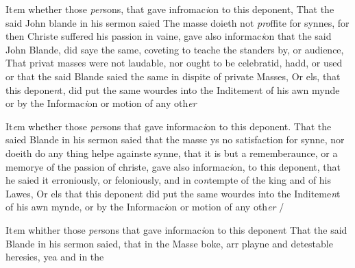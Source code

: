 \documentclass[12pt, a4paper]{book}
\begin{document}
 



				\marginpar[\vspace{0.5cm}{\textcolor{Gray}{2.}}]{}
			
	
		\ifthenelse{\isodd{\thepage}}
		{\reversemarginpar}
		{\normalmarginpar}
		 It\textit{e}m whether those \textit{per}sons, that gave infromac\textit{i}on to this
		deponent, That the said John blande in his sermon saied
 The masse doieth not \textit{pro}ffite for synnes, for then Christe
 suffered his passion in vaine, gave also informac\textit{i}on
		that the said John Blande, did saye the same, coveting to
 teache the standers by, or audience, That privat masses
 were not laudable, nor ought to be celebratid, hadd, or used
 or that the said Blande saied the same in dispite of
 private Masses, Or els, that this depone\textit{n}t, did put
 the same wourdes into the Inditeme\textit{n}t of his awn mynde
 or by the Informac\textit{i}on or motion of any oth\textit{er}
 




				\marginpar[\vspace{0.5cm}{\textcolor{Gray}{3.}}]{}
			
	
		\ifthenelse{\isodd{\thepage}}
		{\reversemarginpar}
		{\normalmarginpar}
		 It\textit{e}m whether those \textit{per}sons that gave informac\textit{i}on to this
		deponent. That the saied Blande in his sermon saied
 that the masse ys no satisfaction for synne, nor doeith
 do any thing helpe againste synne, that it is but
 a rememberaunce, or a memorye of the passion of christe,
 gave also informac\textit{i}on, to this deponent, that he saied it
 erroniously, or feloniously, and in co\textit{n}tempte of the king and
 of his Lawes, Or els that this depone\textit{n}t did put the same
 wourdes into the Inditeme\textit{n}t of his awn mynde, or by the
 Informac\textit{i}on or motion of any oth\textit{er} /
 




				\marginpar[\vspace{0.5cm}{\textcolor{Gray}{4.}}]{}
			
	
		\ifthenelse{\isodd{\thepage}}
		{\reversemarginpar}
		{\normalmarginpar}
		 It\textit{e}m whither those \textit{per}sons that gave informac\textit{i}on to this depone\textit{n}t
		That the said Blande in his sermon saied, that  in the Masse
 boke, arr playne and detestable heresies, yea and in the

\dotfill
					
\end{document}
